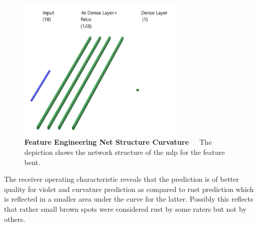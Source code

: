 \begin{figure}[!htb]
	\centering
	\includegraphics[width=0.70\textwidth]{Figures/chapter04/fe_curvature.png}
	\decoRule
	\caption[Feature Engineering Net Structure Curvature]{\textbf{Feature Engineering Net Structure Curvature}~~~The depiction shows the network structure of the \acrshort{mlp} for the feature bent.}
	\label{fig:FeatureEngineeringNetStructureCurve}
\end{figure}

The receiver operating characteristic reveals that the prediction is of better quality for violet and curvature prediction as compared to rust prediction which is reflected in a smaller area under the curve for the latter. Possibly this reflects that rather small brown spots were considered rust by some raters but not by others. 

\begin{table}[!h]
	\centering
	\caption[Feature Engineering Curvature Prediction]{\textbf{Curvature Prediction}~~~Performance of curvature prediction based on angles.}
	\label{tab:performance_angle_based}
\end{table}

